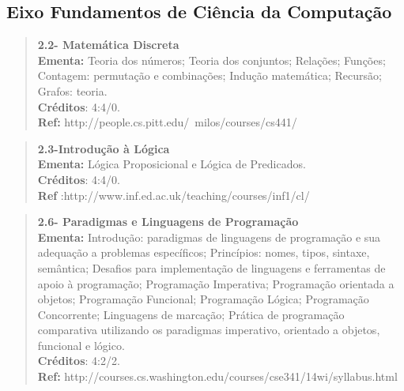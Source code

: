 \subsection{Eixo Fundamentos de Ciência da Computação}



\begin{quote}
\textbf{2.2- Matemática Discreta}
\\  
\textbf{Ementa:} Teoria dos números; Teoria dos conjuntos; Relações; Funções; Contagem: permutação e combinações; Indução matemática; Recursão; Grafos: teoria.
\\
\textbf{Créditos}: 4:4/0.
\\
\textbf{Ref:} http://people.cs.pitt.edu/~milos/courses/cs441/
\end{quote}



\begin{quote}
\textbf{2.3-Introdução à Lógica}
\\  
\textbf{Ementa:} Lógica Proposicional e Lógica de Predicados.
\\
\textbf{Créditos}: 4:4/0.
\\
\textbf{Ref} :http://www.inf.ed.ac.uk/teaching/courses/inf1/cl/
\end{quote}










\begin{quote}
\textbf{2.6- Paradigmas e Linguagens de Programação}
\\  
\textbf{Ementa:} Introdução: paradigmas de linguagens de programação e sua adequação a problemas específicos; Princípios: nomes, tipos, sintaxe, semântica; Desafios para implementação de linguagens e ferramentas de apoio à programação; Programação Imperativa; Programação orientada a objetos; Programação Funcional; Programação Lógica; Programação Concorrente; Linguagens de marcação; Prática de programação comparativa utilizando os paradigmas imperativo, orientado a objetos, funcional e lógico.
\\
\textbf{Créditos}: 4:2/2.
\\
\textbf{Ref:} http://courses.cs.washington.edu/courses/cse341/14wi/syllabus.html
\end{quote}




